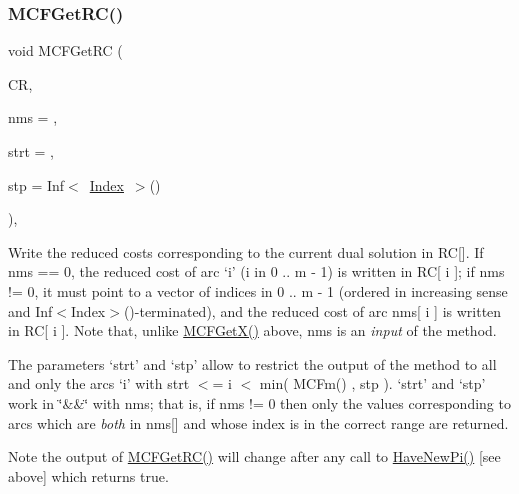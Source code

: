 \subsubsection{\texorpdfstring{M\+C\+F\+Get\+R\+C()}{MCFGetRC()}\hspace{0.1cm}{\footnotesize\ttfamily [4/5]}}
{\footnotesize\ttfamily void M\+C\+F\+Get\+RC (\begin{DoxyParamCaption}\item[{\mbox{\hyperlink{class_m_c_f_class_a62409402be4e4b301e1a568f99f877be}{C\+Row}}}]{CR,  }\item[{\mbox{\hyperlink{class_m_c_f_class_a81575b2d4e4d5636b17170432150ae69}{c\+Index\+\_\+\+Set}}}]{nms = {},  }\item[{\mbox{\hyperlink{class_m_c_f_class_a76aaabb20535c51a2752b93f6c38fe54}{c\+Index}}}]{strt = {},  }\item[{\mbox{\hyperlink{class_m_c_f_class_ad53d6229d7ec28555a9c9c2fd9abf773}{Index}}}]{stp = {\ttfamily Inf$<$~\mbox{\hyperlink{class_m_c_f_class_ad53d6229d7ec28555a9c9c2fd9abf773}{Index}}~$>$()} }\end{DoxyParamCaption})\hspace{0.3cm}{\ttfamily [override]}, {\ttfamily [virtual]}}

Write the reduced costs corresponding to the current dual solution in RC\mbox{[}\mbox{]}. If nms == 0, the reduced cost of arc `i' (i in 0 .. m -\/ 1) is written in RC\mbox{[} i \mbox{]}; if nms != 0, it must point to a vector of indices in 0 .. m -\/ 1 (ordered in increasing sense and Inf$<$\+Index$>$()-\/terminated), and the reduced cost of arc nms\mbox{[} i \mbox{]} is written in RC\mbox{[} i \mbox{]}. Note that, unlike \mbox{\hyperlink{class_m_c_f_class_a4eb307e0707adaef99bb0e08c9e10eb8}{M\+C\+F\+Get\+X()}} above, nms is an {\itshape input} of the method.

The parameters `strt' and `stp' allow to restrict the output of the method to all and only the arcs `i' with strt $<$= i $<$ min( M\+C\+Fm() , stp ). `strt' and `stp' work in \char`\"{}\&\&\char`\"{} with nms; that is, if nms != 0 then only the values corresponding to arcs which are {\itshape both} in nms\mbox{[}\mbox{]} and whose index is in the correct range are returned.

\begin{DoxyNote}{Note}
the output of \mbox{\hyperlink{class_m_c_f_class_af027cee8179a876a4879c73820c380d1}{M\+C\+F\+Get\+R\+C()}} will change after any call to \mbox{\hyperlink{class_m_c_f_class_a87b2b6516a7874ac55145312bd2d55bb}{Have\+New\+Pi()}} \mbox{[}see above\mbox{]} which returns true. 
\end{DoxyNote}


